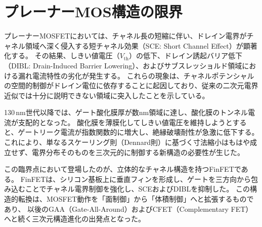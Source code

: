 \section{プレーナーMOS構造の限界}
プレーナーMOSFETにおいては、チャネル長の短縮に伴い、ドレイン電界がチャネル領域へ深く侵入する短チャネル効果（SCE: Short Channel Effect）が顕著化する。  
その結果、しきい値電圧（$V_{\mathrm{th}}$）の低下、ドレイン誘起バリア低下（DIBL: Drain-Induced Barrier Lowering）、およびサブスレッショルド領域における漏れ電流特性の劣化が発生する。  
これらの現象は、チャネルポテンシャルの空間的制御がドレイン電位に依存することに起因しており、従来の二次元電界近似では十分に説明できない領域に突入したことを示している。

130\,nm世代以降では、ゲート酸化膜厚が数\si{\nano\meter}領域に達し、酸化膜のトンネル電流が支配的となった。  
酸化膜を薄膜化してしきい値電圧を維持しようとすると、ゲートリーク電流が指数関数的に増大し、絶縁破壊耐性が急激に低下する。  
これにより、単なるスケーリング則（Dennard則）に基づく寸法縮小はもはや成立せず、電界分布そのものを三次元的に制御する新構造の必要性が生じた。

この臨界点において登場したのが、立体的なチャネル構造を持つFinFETである。  
FinFETは、シリコン基板上に垂直フィンを形成し、ゲートを三方向から包み込むことでチャネル電界制御を強化し、SCEおよびDIBLを抑制した。  
この構造的転換は、MOSFET動作を「面制御」から「体積制御」へと拡張するものであり、  
以後のGAA（Gate-All-Around）およびCFET（Complementary FET）へと続く三次元構造進化の出発点となった。
